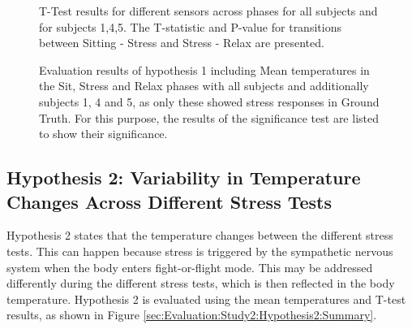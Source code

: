 \begin{figure}[ht]
    \begin{subtable}{\textwidth}
        \centering
        \caption{T-Test results for different sensors across phases for all subjects and for subjects 1,4,5. The T-statistic and P-value for transitions between Sitting - Stress and Stress - Relax are presented.}
        \label{subsec:Evaluation:Study2:Hypothesis1:TTest_Results}
    \end{subtable}
    \caption{Evaluation results of hypothesis 1 including Mean temperatures in the Sit, Stress and Relax phases with all subjects and additionally subjects 1, 4 and 5, as only these showed stress responses in Ground Truth. For this purpose, the results of the significance test are listed to show their significance.}
    \label{sec:Evaluation:Study2:Hypothesis1:Summary}
\end{figure}

\subsection{Hypothesis 2: Variability in Temperature Changes Across Different Stress Tests}
\label{subsec:Evaluation:Study2:Hypothesis2}
Hypothesis 2 states that the temperature changes between the different stress tests. 
This can happen because stress is triggered by the sympathetic nervous system when the body enters fight-or-flight mode.
This may be addressed differently during the different stress tests, which is then reflected in the body temperature.
Hypothesis 2 is evaluated using the mean temperatures and T-test results, as shown in Figure \ref{sec:Evaluation:Study2:Hypothesis2:Summary}. 

